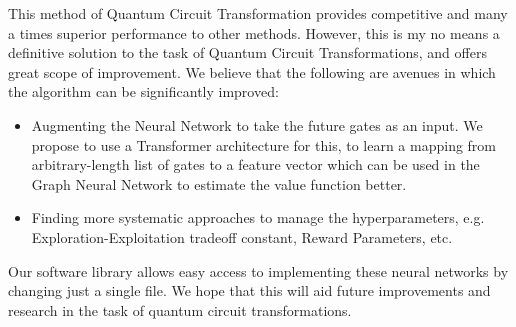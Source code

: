 \documentclass[%
 reprint,
 amsmath,amssymb,
 aps,
]{revtex4-2}
\begin{document}
This method of Quantum Circuit Transformation provides competitive and many a times superior performance to other methods. However, this is my no means a definitive solution to the task of Quantum Circuit Transformations, and offers great scope of improvement. We believe that the following are avenues in which the algorithm can be significantly improved:
\begin{itemize}
    \item Augmenting the Neural Network to take the future gates as an input. We propose to use a Transformer architecture for this, to learn a mapping from arbitrary-length list of gates to a feature vector which can be used in the Graph Neural Network to estimate the value function better.
    \item Finding more systematic approaches to manage the hyperparameters, e.g. Exploration-Exploitation tradeoff constant, Reward Parameters, etc.
\end{itemize}
Our software library allows easy access to implementing these neural networks by changing just a single file. We hope that this will aid future improvements and research in the task of quantum circuit transformations.

\appendix

\nocite{*}

\end{document}
